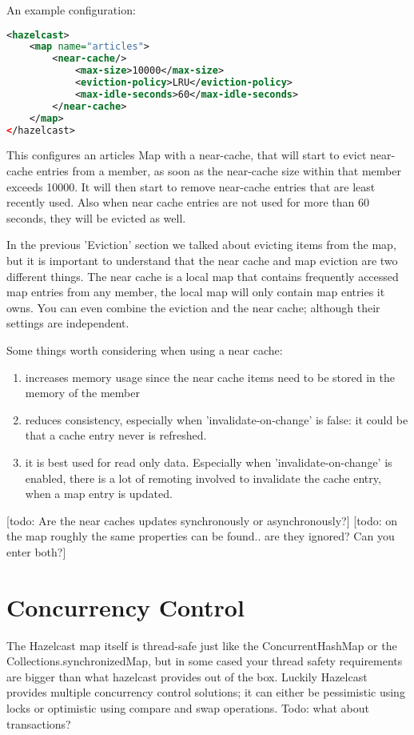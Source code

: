 An example configuration:
\begin{lstlisting}[language=xml]
<hazelcast>
    <map name="articles">
        <near-cache/>
            <max-size>10000</max-size>
            <eviction-policy>LRU</eviction-policy>
            <max-idle-seconds>60</max-idle-seconds>
        </near-cache>
    </map>
</hazelcast>
\end{lstlisting}
This configures an articles Map with a near-cache, that will start to evict near-cache entries from a member, as soon as the near-cache size within that member exceeds 10000. It will then start to remove near-cache entries that are least recently used. Also when near cache entries are not used for more than 60 seconds, they will be evicted as well.

In the previous 'Eviction' section we talked about evicting items from the map, but it is important to understand that the near cache and map eviction are two different things. The near cache is a local map that contains frequently accessed map entries from any member, the local map will only contain map entries it owns. You can even combine the eviction and the near cache; although their settings are independent. 

Some things worth considering when using a near cache:
\begin{enumerate}
\item increases memory usage since the near cache items need to be stored in the memory of the member
\item reduces consistency, especially when 'invalidate-on-change' is false: it could be that a cache entry never is refreshed.
\item it is best used for read only data. Especially when 'invalidate-on-change' is enabled, there is a lot of remoting involved to invalidate the cache entry, when a map entry is updated.
\end{enumerate}

[todo: Are the near caches updates synchronously or asynchronously?]
[todo: on the map roughly the same properties can be found.. are they ignored? Can you enter both?]

\section{Concurrency Control}
The Hazelcast map itself is thread-safe just like the ConcurrentHashMap or the Collections.synchronizedMap, but in some cased your thread safety requirements are bigger than what hazelcast provides out of the box. Luckily Hazelcast provides multiple concurrency control solutions;  it can either be pessimistic using locks or optimistic using compare and swap operations. Todo: what about transactions?

